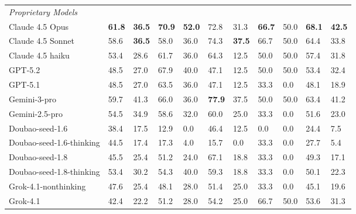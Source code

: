 \documentclass{article}
\theoremstyle{plain}
\theoremstyle{definition}
\theoremstyle{remark}
\begin{document}
\begin{table}[t]
\begin{center}
\begin{small}
\begin{tabularx}{\textwidth}{lYYYYYYYYYY}
        \textit{Proprietary Models} & & & & & & & & & & \\
        \hspace{1em}Claude 4.5 Opus      & \textbf{61.8} & \textbf{36.5} & \textbf{70.9} & \textbf{52.0} & 72.8 & 31.3 & \textbf{66.7} & 50.0 & \textbf{68.1} & \textbf{42.5} \\
        \hspace{1em}Claude 4.5 Sonnet    & 58.6 & \textbf{36.5} & 58.0 & 36.0 & 74.3 & \textbf{37.5} & 66.7 & 50.0 & 64.4 & 33.8 \\
        \hspace{1em}Claude 4.5 haiku     & 53.4 & 28.6 & 61.7 & 36.0 & 64.3 & 12.5 & 50.0 & 50.0 & 57.4 & 31.8 \\
        \hspace{1em}GPT-5.2              & 48.5 & 27.0 & 67.9 & 40.0 & 47.1 & 12.5 & 50.0 & 50.0    & 53.4 & 32.4 \\
        \hspace{1em}GPT-5.1              & 48.5 & 27.0 & 63.5 & 36.0 & 47.1 & 12.5 & 33.3 & 0.0    & 48.1 & 18.9 \\
        \hspace{1em}Gemini-3-pro         & 59.7 & 41.3 & 66.0 & 36.0 & \textbf{77.9} & 37.5 & 50.0 & 50.0 & 63.4 &  41.2 \\
        \hspace{1em}Gemini-2.5-pro       & 54.5 & 34.9 & 58.6 & 32.0 & 60.0 & 25.0 & 33.3    & 0.0   & 51.6 & 23.0 \\           
        \hspace{1em}Doubao-seed-1.6      & 38.4 & 17.5 & 12.9 & 0.0    & 46.4 & 12.5 & 0.0 & 0.0    & 24.4 & 7.5 \\
        \hspace{1em}Doubao-seed-1.6-thinking& 44.5 & 17.4 & 17.3 & 4.0  & 15.7 & 0.0    & 33.3 & 0.0    & 27.7 & 5.4 \\
        \hspace{1em}Doubao-seed-1.8      & 45.5 & 25.4 & 51.2 & 24.0 & 67.1 & 18.8 & 33.3 & 0.0    & 49.3 & 17.1 \\
        \hspace{1em}Doubao-seed-1.8-thinking& 53.4 & 30.2 & 54.3 & 40.0 & 59.3 & 18.8 & 33.3 & 0.0    & 50.1 & 22.3 \\    
        \hspace{1em}Grok-4.1-nonthinking & 47.6 & 25.4 & 48.1 & 28.0 & 51.4 & 25.0 & 33.3    & 0.0   & 45.1 & 19.6 \\ 
        \hspace{1em}Grok-4.1             & 42.4 & 22.2 & 51.2 & 28.0 & 54.2 & 25.0 & 66.7    & 50.0   & 53.6 & 31.3 \\ 
        

\end{tabularx}
\end{small}
\end{center}
\end{table}
\end{document}
